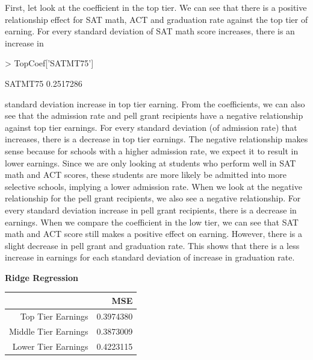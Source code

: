 \documentclass{article}
\begin{document}
\noindent First, let look at the coefficient in the top tier.  We can see that there is a positive relationship effect for SAT math, ACT and graduation rate against the top tier of earning.  For every standard deviation of SAT math score increases, there is an increase in 
\begin{Schunk}
\begin{Sinput}
> TopCoef['SATMT75']
\end{Sinput}
\begin{Soutput}
  SATMT75 
0.2517286 
\end{Soutput}
\end{Schunk}
standard deviation increase in top tier earning. From the coefficients, we can also see that the admission rate and pell grant recipients have a negative relationship against top tier earnings.  For every standard deviation (of admission rate) that increases, there is a decrease in top tier earnings.  The negative relationship makes sense because for schools with a higher admission rate, we expect it to result in lower earnings.  Since we are only looking at students who perform well in SAT math and ACT scores, these students are more likely be admitted into more selective schools, implying a lower admission rate.  When we look at the negative relationship for the pell grant recipients, we also see a negative relationship.  For every standard deviation increase in pell grant recipients, there is a decrease in earnings. 
When we compare the coefficient in the low tier, we can see that SAT math and ACT score still makes a positive effect on earning. However, there is a slight decrease in pell grant and graduation rate.  This shows that there is a less increase in earnings for each standard deviation of increase in graduation rate. 
\newline
\newline

\noindent \textbf{Ridge Regression}\newline
\begin{table}[ht]
\centering
\begin{tabular}{rr}
  \hline
 & MSE \\ 
  \hline
Top Tier Earnings & 0.3974380 \\ 
  Middle Tier Earnings & 0.3873009 \\ 
  Lower Tier Earnings & 0.4223115 \\ 
   \hline
\end{tabular}
\end{table}\newline
\end{document}
